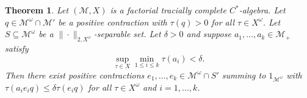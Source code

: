 \documentclass[a4paper,11pt]{amsart}
\newtheorem{theorem}{Theorem}
\theoremstyle{definition}
\numberwithin{equation}{section}
\numberwithin{theorem}{section}
\newcommand{\M}{\mathcal{M}}
\begin{document}
\begin{theorem}\label{thm:weak-CPoU}
    Let $(\M, X)$ is a factorial tracially complete $C^*$-algebra. 
    Let $q \in \M^\omega \cap \M'$ be a positive contraction with $\tau(q) > 0$ for all $\tau \in X^\omega$.
    Let $S \subseteq \M^\omega$ be a $\|\cdot\|_{2, X^\omega}$-separable set.
    Let $\delta > 0$ and suppose $a_1,\ldots,a_k \in \M_+$ satisfy
    \begin{equation}
        \sup_{\tau \in X} \min_{1 \leq i \leq k} \tau(a_i) < \delta.
    \end{equation}
    Then there exist positive contractions $e_1, \ldots, e_k \in \M^\omega \cap S'$ summing to $1_{\M^\omega}$ with $\tau(a_i e_iq) \leq \delta \tau(e_iq)$ for all $\tau \in X^\omega$ and $i = 1, \ldots, k$.
\end{theorem}	
\end{document}
